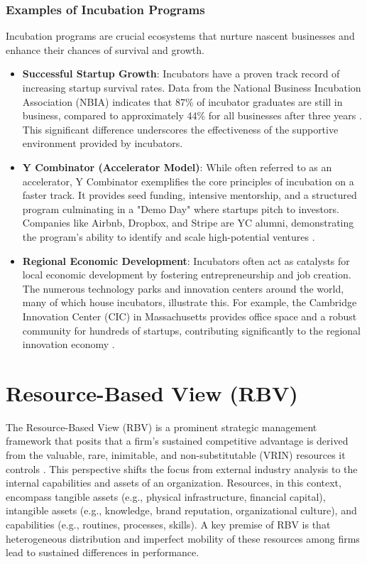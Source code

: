 \documentclass[../Main.tex]{subfiles}
\begin{document}
\subsubsection*{Examples of Incubation Programs}
Incubation programs are crucial ecosystems that nurture nascent businesses and enhance their chances of survival and growth.
\begin{itemize}
    \item \textbf{Successful Startup Growth}: Incubators have a proven track record of increasing startup survival rates. Data from the National Business Incubation Association (NBIA) indicates that 87\% of incubator graduates are still in business, compared to approximately 44\% for all businesses after three years \cite{NBIA2012}. This significant difference underscores the effectiveness of the supportive environment provided by incubators.
    \item \textbf{Y Combinator (Accelerator Model)}: While often referred to as an accelerator, Y Combinator exemplifies the core principles of incubation on a faster track. It provides seed funding, intensive mentorship, and a structured program culminating in a "Demo Day" where startups pitch to investors. Companies like Airbnb, Dropbox, and Stripe are YC alumni, demonstrating the program's ability to identify and scale high-potential ventures \cite{YCombinator2024}.
    \item \textbf{Regional Economic Development}: Incubators often act as catalysts for local economic development by fostering entrepreneurship and job creation. The numerous technology parks and innovation centers around the world, many of which house incubators, illustrate this. For example, the Cambridge Innovation Center (CIC) in Massachusetts provides office space and a robust community for hundreds of startups, contributing significantly to the regional innovation economy \cite{CIC2024}.
\end{itemize}

\section{Resource-Based View (RBV)}

The Resource-Based View (RBV) is a prominent strategic management framework that posits that a firm's sustained competitive advantage is derived from the valuable, rare, inimitable, and non-substitutable (VRIN) resources it controls \cite{barney1991firm}. This perspective shifts the focus from external industry analysis to the internal capabilities and assets of an organization. Resources, in this context, encompass tangible assets (e.g., physical infrastructure, financial capital), intangible assets (e.g., knowledge, brand reputation, organizational culture), and capabilities (e.g., routines, processes, skills). A key premise of RBV is that heterogeneous distribution and imperfect mobility of these resources among firms lead to sustained differences in performance.
\end{document}
